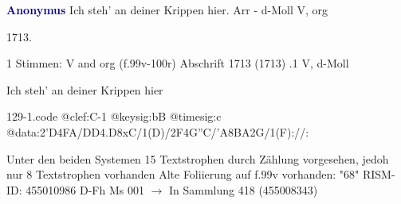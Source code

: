 \documentclass[twocolumn]{book}
\begin{document}
\newline \par \vspace{7pt} \textcolor{darkblue}{\textbf{Anonymus  }}
\newline Ich steh' an deiner Krippen hier. Arr - d-Moll
\newline V, org
\newline \begin{itshape} 1713.\end{itshape} 
\newline \textcolor{darkblue}{}  1 Stimmen: V and org  (f.99v-100r)
\newline Abschrift  1713 (1713)
.1  V, d-Moll
\newline \begin{footnotesize} Ich steh' an deiner Krippen hier \end{footnotesize}  
\begin{filecontents*}{129-1.code}
@clef:C-1
@keysig:bB
@timesig:c
@data:2'D4FA/DD4.D8xC/1(D)/2F4G''C/'A{8BA}2G/1(F)://:
\end{filecontents*}
\newline
%
\newline Unter den beiden Systemen 15 Textstrophen durch Zählung vorgesehen, jedoh nur 8 Textstrophen vorhanden
\newline Alte Foliierung auf f.99v vorhanden: "68"
\newline RISM-ID: 455010986
\newline D-Fh  Ms 001
\newline $\rightarrow$ In Sammlung 418 (455008343)
      
\end{document}
